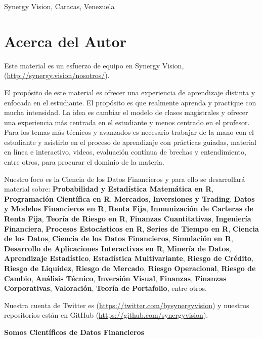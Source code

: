 \documentclass[12pt,]{krantz}
\theoremstyle{definition}
\theoremstyle{definition}
\theoremstyle{definition}
\theoremstyle{remark}
\let\BeginKnitrBlock\begin \let\EndKnitrBlock\end
\begin{document}
\BeginKnitrBlock{flushright}
Synergy Vision, Caracas, Venezuela
\EndKnitrBlock{flushright}

\chapter*{Acerca del Autor}\label{acerca-del-autor}


Este material es un esfuerzo de equipo en Synergy Vision,
(\url{http://synergy.vision/nosotros/}).

El propósito de este material es ofrecer una experiencia de aprendizaje
distinta y enfocada en el estudiante. El propósito es que realmente
aprenda y practique con mucha intensidad. La idea es cambiar el modelo
de clases magistrales y ofrecer una experiencia más centrada en el
estudiante y menos centrado en el profesor. Para los temas más técnicos
y avanzados es necesario trabajar de la mano con el estudiante y
asistirlo en el proceso de aprendizaje con prácticas guiadas, material
en línea e interactivo, videos, evaluación contínua de brechas y
entendimiento, entre otros, para procurar el dominio de la materia.

Nuestro foco es la Ciencia de los Datos Financieros y para ello se
desarrollará material sobre: \textbf{Probabilidad y Estadística
Matemática en R}, \textbf{Programación Científica en R},
\textbf{Mercados}, \textbf{Inversiones y Trading}, \textbf{Datos y
Modelos Financieros en R}, \textbf{Renta Fija}, \textbf{Inmunización de
Carteras de Renta Fija}, \textbf{Teoría de Riesgo en R},
\textbf{Finanzas Cuantitativas}, \textbf{Ingeniería Financiera},
\textbf{Procesos Estocásticos en R}, \textbf{Series de Tiempo en R},
\textbf{Ciencia de los Datos}, \textbf{Ciencia de los Datos
Financieros}, \textbf{Simulación en R}, \textbf{Desarrollo de
Aplicaciones Interactivas en R}, \textbf{Minería de Datos},
\textbf{Aprendizaje Estadístico}, \textbf{Estadística Multivariante},
\textbf{Riesgo de Crédito}, \textbf{Riesgo de Liquidez}, \textbf{Riesgo
de Mercado}, \textbf{Riesgo Operacional}, \textbf{Riesgo de Cambio},
\textbf{Análisis Técnico}, \textbf{Inversión Visual}, \textbf{Finanzas},
\textbf{Finanzas Corporativas}, \textbf{Valoración}, \textbf{Teoría de
Portafolio}, entre otros.

Nuestra cuenta de Twitter es (\url{https://twitter.com/bysynergyvision})
y nuestros repositorios están en GitHub
(\url{https://github.com/synergyvision}).

\textbf{Somos Científicos de Datos Financieros}

\mainmatter
\end{document}
